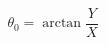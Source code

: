 \documentclass[a4paper,13pt]{article}
\begin{document}

\begin{equation} \label{theta_0_eq_final}
\theta_0 = \arctan{\frac{Y}{X}}
\end{equation}












\end{document}
